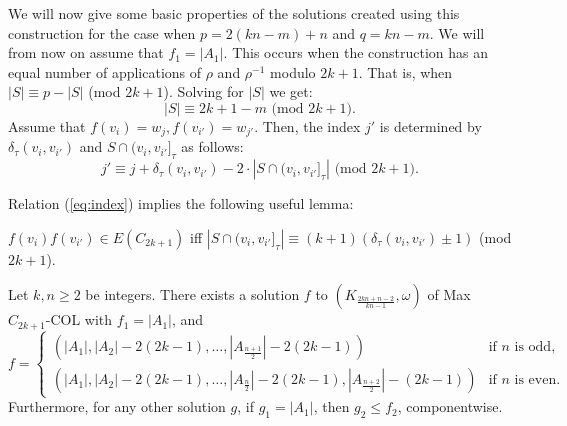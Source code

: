 \documentclass[11pt,a4paper]{article}
\begin{document}
We will now give some basic properties of the solutions created using this
construction for the case when $p = 2(kn-m)+n$ and $q = kn-m$.
We will from now on assume that $f_1 = |A_1|$. 
This occurs when the construction has an equal number of applications of
$\rho$ and $\rho^{-1}$ modulo $2k+1$. That is, when $|S| \equiv p-|S| $ (mod $2k+1$).
Solving for $|S|$ we get:
\begin{equation} \label{eq:fulla1}
  |S| \equiv 2k+1-m \text{ (mod $2k+1$)}.
\end{equation}
Assume that $f(v_i) = w_j, f(v_{i'}) = w_{j'}$.
Then, the index $j'$ is determined by $\delta_{\tau}(v_i,v_{i'})$ and
$S \cap (v_i, v_{i'}]_{\tau}$ as follows:
\begin{equation} \label{eq:index}
  j' \equiv j+\delta_{\tau}(v_i,v_{i'}) - 2 \cdot |S \cap (v_i, v_{i'}]_{\tau}| \text{ (mod $2k+1$)}.
\end{equation}






\noindent
Relation (\ref{eq:index}) implies the following useful lemma:

\begin{lemma} \label{lem:usefulcong}
  $f(v_i) f(v_{i'}) \in E(C_{2k+1})$ iff
  $|S \cap (v_i, v_{i'}]_{\tau}| \equiv (k+1)(\delta_{\tau}(v_i,v_{i'}) \pm 1) $ (mod $2k+1$).
\end{lemma}










\begin{lemma}
\label{lem:solbeta}
Let $k,n \geq 2$ be integers.
There exists a solution $f$ to $(K_{\frac{2kn+n-2}{kn-1}},\omega)$ of {\sc Max $C_{2k+1}$-COL} with $f_1 = |A_1|$, and
\[
f = \begin{cases}
(|A_1|,|A_2|-2(2k-1),\ldots,|A_{\frac{n+1}{2}}|-2(2k-1)) & \text{if $n$ is odd,} \\
(|A_1|,|A_2|-2(2k-1),\ldots,|A_{\frac{n}{2}}|-2(2k-1),|A_{\frac{n+2}{2}}|-(2k-1)) & \text{if $n$ is even.}
\end{cases}
\]
Furthermore, for any other solution $g$, if $g_1 = |A_1|$, then $g_2 \leq f_2$,
componentwise.
\end{lemma}
\end{document}
